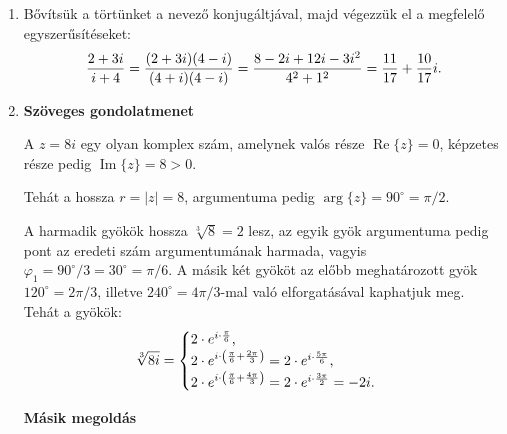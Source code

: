 \documentclass[11pt]{scrartcl}
\begin{document}
\begin{enumerate}
	\item Bővítsük a törtünket a nevező konjugáltjával, majd végezzük el a
	      megfelelő egyszerűsítéseket:
	      \[
		      \frac{2 + 3i}{i + 4}
		      = \frac{(2 + 3i)(4 - i)}{(4 + i)(4 - i)}
		      = \frac{8 - 2i + 12i - 3i^2}{4^2 + 1^2}
		      = \frac{11}{17} + \frac{10}{17} i
		      \text.
	      \]

	\item \textbf{Szöveges gondolatmenet}

	      A $z = 8i$ egy olyan komplex szám, amelynek valós része
	      $\operatorname{Re} \{z\} = 0$, képzetes része pedig
	      $\operatorname{Im} \{z\} = 8 > 0$.

	      Tehát a hossza $r = |z| = 8$, argumentuma pedig
	      $\arg \{z\} = 90^\circ = \pi / 2$.

	      A harmadik gyökök hossza $\sqrt[3]{8} = 2$ lesz, az egyik gyök
	      argumentuma pedig pont az eredeti szám argumentumának harmada, vagyis
	      $\varphi_1 = 90^\circ / 3 = 30^\circ = \pi / 6$. A másik két
	      gyököt az előbb meghatározott gyök $120^\circ = 2\pi/3$, illetve
	      $240^\circ = 4\pi / 3$-mal való elforgatásával kaphatjuk meg. Tehát
	      a gyökök:
	      \[
		      \sqrt[3]{8i} = \begin{cases}
			      2 \cdot e^{i \cdot \frac{\pi}{6}}
			      \text,
			      \\
			      2 \cdot e^{i \cdot \left(\frac{\pi}{6} + \frac{2\pi}{3}\right)}
			      = 2 \cdot e^{i \cdot \frac{5\pi}{6}}
			      \text,
			      \\
			      2 \cdot e^{i \cdot \left(\frac{\pi}{6} + \frac{4\pi}{3}\right)}
			      = 2 \cdot e^{i \cdot \frac{3\pi}{2}}
			      = -2i
			      \text.
		      \end{cases}
	      \]


	      \textbf{Másik megoldás}


\end{enumerate}
\end{document}
